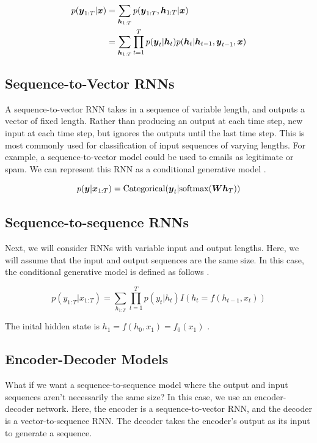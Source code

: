 \documentclass{article}
\begin{document}
\begin{align*}
    p(\vb*{y}_{1:T}|\vb*{x}) &= \sum_{\vb*{h}_{1:T}}p(\vb*{y}_{1:T},\vb*{h}_{1:T}|\vb*{x}) \\
    &= \sum_{\vb*{h}_{1:T}} \prod_{t=1}^T p(\vb*{y}_t|\vb*{h}_t)p(\vb*{h}_t|\vb*{h}_{t-1},\vb*{y}_{t-1},\vb*{x})
\end{align*}

\subsection{Sequence-to-Vector RNNs}

A sequence-to-vector RNN takes in a sequence of variable length, and outputs a vector of fixed length. Rather than producing an output at each time step,  new input at each time step, but ignores the outputs until the last time step. This is most commonly used for classification of input sequences of varying lengths. For example, a sequence-to-vector model could be used to emails as legitimate or spam. We can represent this RNN as a conditional generative model \cite{pml1book}. 

\[p(\vb*{y}|\vb*{x}_{1:T}) = \text{Categorical}(\vb*{y}_t|\text{softmax}(\vb*{W}\vb*{h}_T))\]

\subsection{Sequence-to-sequence RNNs}

Next, we will consider RNNs with variable input and output lengths. Here, we will assume that the input and output sequences are the same size. In this case, the conditional generative model is defined as follows \cite{pml1book}.

\[p(y_{1:T}|x_{1:T}) = \sum_{h_{1:T}}\prod^T_{t=1}p(y_t|h_t)I(h_t=f(h_{t-1},x_t))\]

The inital hidden state is \(h_1 = f(h_0, x_1) = f_0(x_1)\) \cite{pml1book}. 


\subsection{Encoder-Decoder Models}

What if we want a sequence-to-sequence model where the output and input sequences aren't necessarily the same size? In this case, we use an encoder-decoder network. Here, the encoder is a sequence-to-vector RNN, and the decoder is a vector-to-sequence RNN. The decoder takes the encoder's output as its input to generate a sequence.
\end{document}
